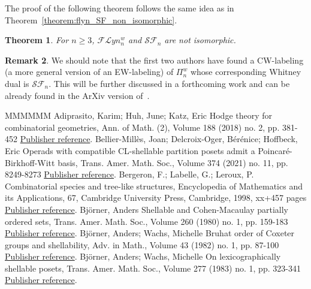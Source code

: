 \documentclass[11pt]{article}
\newtheorem{theo}{Theorem}[section]
\theoremstyle{definition}
\newtheorem{rema}[theo]{Remark}
\numberwithin{equation}{section}
\newcommand{\Flyn}{\mathcal{FL}yn}
\newcommand{\SF}{\mathcal{SF}}
\begin{document}
The proof of the following theorem follows the same  idea as in Theorem~\ref{theorem:flyn_SF_non_isomorphic}.
\begin{theo}
 For $n\geq 3$, $\Flyn_{n}^{w}$ and $\SF_n$ are not isomorphic. 
\end{theo}

 \begin{rema}
 We should note that the first two authors have found a CW-labeling (a more general version of an EW-labeling) of $\Pi_n^w$ whose corresponding Whitney dual is $\SF_n$. This will be further discussed in a forthcoming work and can be already found in the ArXiv version of~\cite{GonzalezHallam2021}. 
 \end{rema}
\begin{thebibliography}{MMMMMM}
 Adiprasito, Karim; Huh, June; Katz, Eric Hodge theory for combinatorial geometries, Ann. of Math. (2), Volume 188 (2018) no. 2, pp. 381-452 \href{https://alco.centre-mersenne.org/articles/10.5802/alco.455/#AdiprasitoHuhKatz2018}{Publisher reference}.
 Bellier-Millès, Joan; Delcroix-Oger, Bérénice; Hoffbeck, Eric Operads with compatible CL-shellable partition posets admit a Poincaré-Birkhoff-Witt basis, Trans. Amer. Math. Soc., Volume 374 (2021) no. 11, pp. 8249-8273 \href{https://alco.centre-mersenne.org/articles/10.5802/alco.455/#BelliermillesDelcroixogerHoffbeck2021}{Publisher reference}.
 Bergeron, F.; Labelle, G.; Leroux, P. Combinatorial species and tree-like structures, Encyclopedia of Mathematics and its Applications, 67, Cambridge University Press, Cambridge, 1998, xx+457 pages \href{https://alco.centre-mersenne.org/articles/10.5802/alco.455/#BergeronLabelleLeroux1998}{Publisher reference}.
 Björner, Anders Shellable and Cohen-Macaulay partially ordered sets, Trans. Amer. Math. Soc., Volume 260 (1980) no. 1, pp. 159-183 \href{https://alco.centre-mersenne.org/articles/10.5802/alco.455/#Bjorner1980}{Publisher reference}.
 Björner, Anders; Wachs, Michelle Bruhat order of Coxeter groups and shellability, Adv. in Math., Volume 43 (1982) no. 1, pp. 87-100 \href{https://alco.centre-mersenne.org/articles/10.5802/alco.455/#BjornerWachs1982}{Publisher reference}.
 Björner, Anders; Wachs, Michelle On lexicographically shellable posets, Trans. Amer. Math. Soc., Volume 277 (1983) no. 1, pp. 323-341 \href{https://alco.centre-mersenne.org/articles/10.5802/alco.455/#BjornerWachs1983}{Publisher reference}.

\end{thebibliography}
\end{document}
